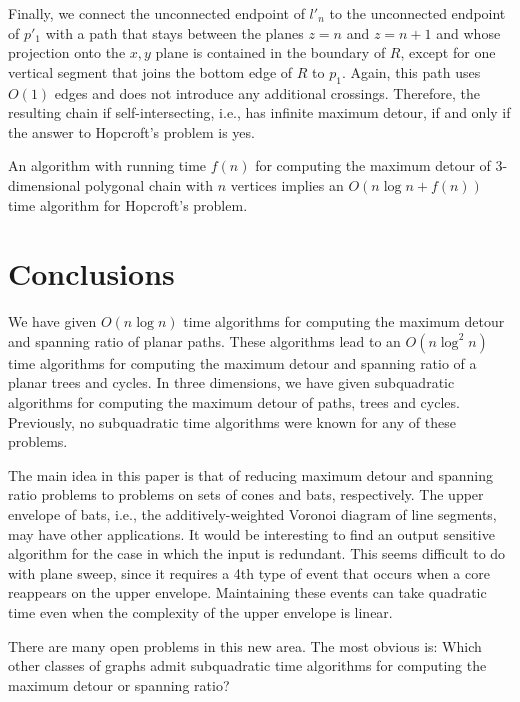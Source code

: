 \documentclass[lotsofwhite]{patmorin}
\begin{document}
Finally, we connect the unconnected endpoint of $l'_n$ to the
unconnected endpoint of $p'_1$ with a path that stays between the
planes $z=n$ and $z=n+1$ and whose projection onto the $x,y$ plane is
contained in the boundary of $R$, except for one vertical segment that
joins the bottom edge of $R$ to $p_1$.  Again, this path uses $O(1)$
edges and does not introduce any additional crossings.  Therefore, the
resulting chain if self-intersecting, i.e., has infinite maximum
detour, if and only if the answer to Hopcroft's problem is yes.

\begin{thm}
An algorithm with running time $f(n)$ for computing the maximum detour
of 3-dimensional polygonal chain with $n$ vertices implies an $O(n\log
n+ f(n))$ time algorithm for Hopcroft's problem.
\end{thm}

\section{Conclusions}

We have given $O(n\log n)$ time algorithms for computing the maximum
detour and spanning ratio of planar paths.  These algorithms lead to
an $O(n\log^2 n)$ time algorithms for computing the maximum detour and
spanning ratio of a planar trees and cycles.  In three dimensions, we
have given subquadratic algorithms for computing the maximum detour of
paths, trees and cycles.  Previously, no subquadratic time algorithms
were known for any of these problems.

The main idea in this paper is that of reducing maximum detour and
spanning ratio problems to problems on sets of cones and bats,
respectively.  The upper envelope of bats, i.e., the
additively-weighted Voronoi diagram of line segments, may have other
applications.  It would be interesting to find an output sensitive
algorithm for the case in which the input is redundant.  This seems
difficult to do with plane sweep, since it requires a 4th type of
event that occurs when a core reappears on the upper envelope.
Maintaining these events can take quadratic time even when the
complexity of the upper envelope is linear.

There are many open problems in this new area.  The most obvious is:
Which other classes of graphs admit subquadratic time algorithms for
computing the maximum detour or spanning ratio?




\end{document}
